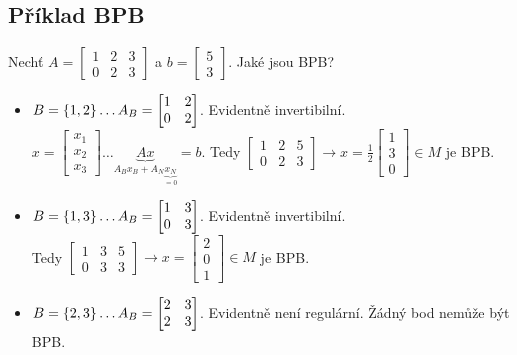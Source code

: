 \subsection{Příklad BPB}
Nechť
$A = 
    \begin{bmatrix}
        1 & 2 & 3 \\
        0 & 2 & 3    
    \end{bmatrix} 
$ a $b = 
    \begin{bmatrix}
        5 \\
        3
    \end{bmatrix}
$. Jaké jsou BPB?
\begin{itemize}
    \item $B = \left\lbrace 1,2 \right\rbrace \dots A_B = 
    \begin{bmatrix}
        1 & 2 \\
        0 & 2
    \end{bmatrix}$. Evidentně invertibilní. \\
    $x = 
    \begin{bmatrix}
    x_1 \\
    x_2 \\
    x_3    
    \end{bmatrix} \dots \underbrace{Ax}_{A_B x_B +  A_N\underbrace{x_N}_{=0}}=b$. Tedy 
    $\left[
        \begin{array}{cc|c}
        1 & 2 & 5 \\
        0 & 2 & 3
        \end{array}
    \right]
    \rightarrow x = \frac{1}{2}
    \begin{bmatrix}
        1 \\
        3 \\
        0
    \end{bmatrix} \in M$ je BPB.
    \item $B = \left\lbrace 1,3 \right\rbrace \dots A_B = 
    \begin{bmatrix}
        1 & 3 \\
        0 & 3
    \end{bmatrix}$. Evidentně invertibilní. \\
    Tedy 
    $\left[
        \begin{array}{cc|c}
        1 & 3 & 5 \\
        0 & 3 & 3
        \end{array}
    \right]
    \rightarrow x =
    \begin{bmatrix}
        2 \\
        0 \\
        1
    \end{bmatrix} \in M$ je BPB.
    \item $B = \left\lbrace 2,3 \right\rbrace \dots A_B = 
    \begin{bmatrix}
        2 & 3 \\
        2 & 3
    \end{bmatrix}$. Evidentně není regulární. Žádný bod nemůže být BPB.
\end{itemize}

